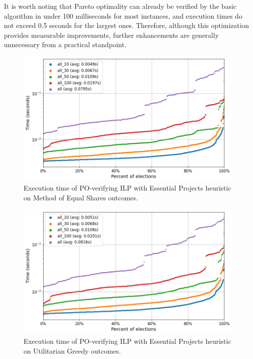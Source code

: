 \documentclass[magisterska,en]{pracamgr}
\newcommand\chartsize{0.94}
\begin{document}
It is worth noting that Pareto optimality can already be verified by the basic algorithm in under 100 milliseconds for most instances, and execution times do not exceed 0.5 seconds for the largest ones. Therefore, although this optimization provides measurable improvements, further enhancements are generally unnecessary from a practical standpoint.

\begin{figure}[h!]
    \centering
    \includegraphics[width=\chartsize\linewidth]{outputs/EssentialProjects/mes.png}
    \caption{Execution time of PO-verifying ILP with Essential Projects heuristic on Method of Equal Shares outcomes.}
    \label{essential-projects-mes}
\end{figure}

\begin{figure}[h!]
    \centering
    \includegraphics[width=\chartsize\linewidth]{outputs/EssentialProjects/greedy.png}
    \caption{Execution time of PO-verifying ILP with Essential Projects heuristic on Utilitarian Greedy outcomes.}
    \label{essential-projects-greedy}
\end{figure}
\end{document}
